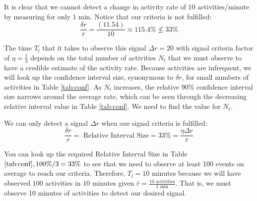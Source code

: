 \documentclass{article}
\begin{document}
It is clear that we cannot detect a change in activity rate of 10 activities/minute by measuring for only 1 min.  Notice that our criteria is not fulfilled:
\begin{equation}
    \label{eq:ex2:notmet}
    \frac{\delta r}{\bar{r}} = \frac{(11.54)}{10} \approx 115.4\% \not\le 33\% 
\end{equation}

The time $T_{l}$ that it takes to observe this signal $\Delta r =20$ with signal criteria factor of $\eta=\frac{1}{3}$ depends 
on the total number of activities $N_t$ that we must observe to have a credible estimate of the activity rate. Because activities 
are infrequent, we will look up the confidence interval size, synonymous to $\delta r$, for small numbers of activities 
in Table \ref{tab:conf}.  As $N_t$ increases, the relative $90\%$ confidence interval size narrows around the 
average rate, which can be seen through the decreasing relative interval value in Table \ref{tab:conf}.  We need to 
find the value for $N_t$.

We can only detect a signal $\Delta r$ when our signal criteria is fulfilled:
\begin{equation}
    \label{eq:ex2:met}
    \frac{\delta r}{\bar{r}} = \text{ Relative Interval Size} = 33\% =  \frac{\eta \Delta r}{\bar{r}}
\end{equation}

You can look up the required Relative Interval Size in Table $\ref{tab:conf}, 100\%/3 = 33\%$ to see
that we need to observe at least 100 events on average to reach our criteria. Therefore, $T_l = 10 \text{ minutes}$ because
we will have observed $100$ activities in $10$ minutes given $\bar{r} = \frac{10 \text{ activities}}{1 \text{ min}}$. That is, we 
must observe 10 minutes of activities to detect our desired signal.
\end{document}
